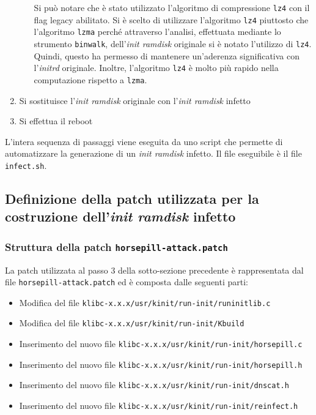 \documentclass[oneside]{article}
\begin{document}
\begin{enumerate}
\begin{enumerate}
Si può notare che è stato utilizzato l'algoritmo di compressione \texttt{lz4} con il flag legacy abilitato. Si è scelto di utilizzare l'algoritmo \texttt{lz4} piuttosto che l'algoritmo \texttt{lzma} perché attraverso l'analisi, effettuata mediante lo strumento \texttt{binwalk}, dell'\textit{init ramdisk} originale si è notato l'utilizzo di \texttt{lz4}. Quindi, questo ha permesso di mantenere un'aderenza significativa con l'\textit{initrd} originale. Inoltre, l'algoritmo \texttt{lz4} è molto più rapido nella computazione rispetto a \texttt{lzma}.
\end{enumerate}
\item Si sostituisce l'\textit{init ramdisk} originale con l'\textit{init ramdisk} infetto
\item Si effettua il reboot
\end{enumerate}

L'intera sequenza di passaggi viene eseguita da uno script che permette di automatizzare la generazione di un \textit{init ramdisk} infetto. Il file eseguibile è il file \texttt{infect.sh}.

\subsection{Definizione della patch utilizzata per la costruzione dell'\textit{init ramdisk} infetto}
\subsubsection{Struttura della patch \texttt{horsepill-attack.patch}}
La patch utilizzata al passo 3 della sotto-sezione precedente è rappresentata dal file \texttt{horsepill-attack.patch} ed è composta dalle seguenti parti:
\begin{itemize}
\item Modifica del file \texttt{klibc-x.x.x/usr/kinit/run-init/runinitlib.c}
\item Modifica del file \texttt{klibc-x.x.x/usr/kinit/run-init/Kbuild}
\item Inserimento del nuovo file \texttt{klibc-x.x.x/usr/kinit/run-init/horsepill.c}
\item Inserimento del nuovo file \texttt{klibc-x.x.x/usr/kinit/run-init/horsepill.h}
\item Inserimento del nuovo file \texttt{klibc-x.x.x/usr/kinit/run-init/dnscat.h}
\item Inserimento del nuovo file \texttt{klibc-x.x.x/usr/kinit/run-init/reinfect.h}
\end{itemize}
\end{document}
